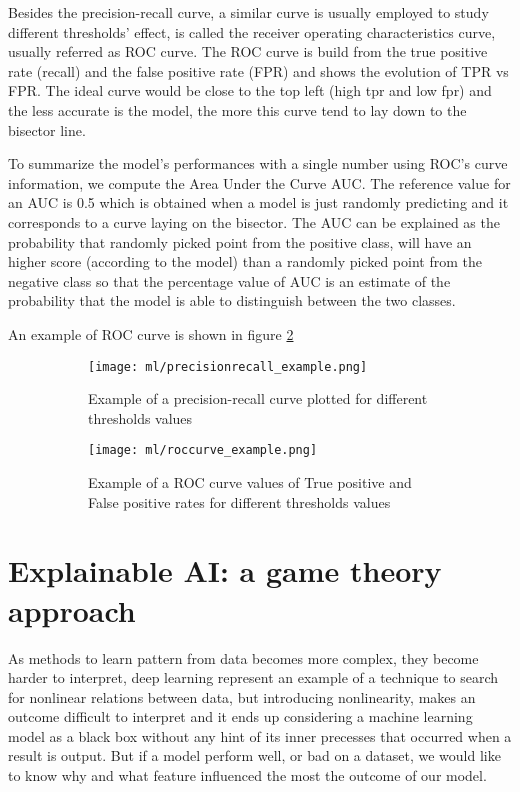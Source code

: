 \documentclass[11pt]{report}
\begin{document}
Besides the precision-recall curve, a similar curve is usually employed to study different thresholds' effect, is called the receiver operating characteristics curve, usually referred as ROC curve.
The ROC curve is build from the true positive rate (recall) and the false positive rate (FPR) and shows the evolution of TPR vs FPR.
The ideal curve would be close to the top left (high tpr and low fpr) and the less accurate is the model, the more this curve tend to lay down to the bisector line.

To summarize the model's performances with a single number using ROC's curve information, we compute the Area Under the Curve AUC.
The reference value for an AUC is 0.5 which is obtained when a model is just randomly predicting and it corresponds to a curve laying on the bisector.
The AUC can be explained as the probability that randomly picked point from the positive class, will have an higher score (according to the model) than a randomly picked point from the negative class so that the percentage value of AUC is an estimate of the probability that the model is able to distinguish between the two classes.

An example of ROC curve is shown in figure \ref{fig:roccurve}


\begin{figure}
\centering
\begin{subfigure}{0.4\textwidth}
\texttt{[image: ml/precisionrecall\_example.png]}
\caption{Example of a precision-recall curve plotted for different thresholds values}
\label{fig:precisionrecall}
\end{subfigure}
\begin{subfigure}{0.4\textwidth}
\texttt{[image: ml/roccurve\_example.png]}
\caption{Example of a ROC curve values of True positive and False positive rates for different thresholds values}
\label{fig:roccurve}
\end{subfigure}
\caption{}
\label{}
\end{figure}



\chapter{Explainable AI: a game theory approach}\label{chap:shapley_values}
As methods to learn pattern from data becomes more complex, they become harder to interpret, deep learning represent an example of a technique to search for nonlinear relations between data, but introducing nonlinearity, makes an outcome difficult to interpret and it ends up considering a machine learning model as a black box without any hint of its inner precesses that occurred when a result is output. But if a model perform well, or bad on a dataset, we would like to know why and what feature influenced the most the outcome of our model.
\end{document}
